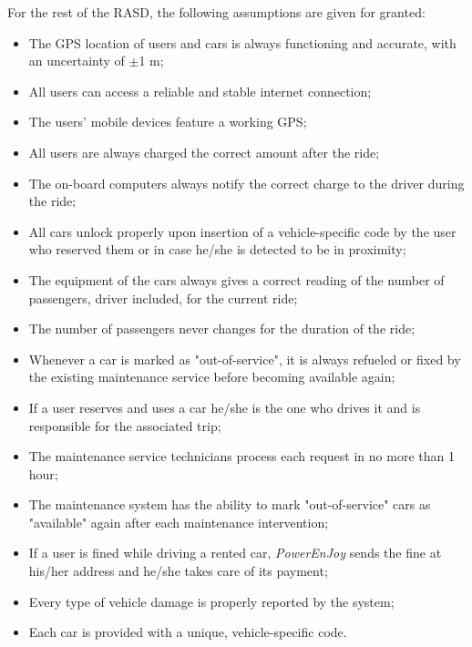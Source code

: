 For the rest of the RASD, the following assumptions are given for granted:

\begin{itemize}
\item The GPS location of users and cars is always functioning and accurate, with an uncertainty of $\pm$1 m; 
\item All users can access a reliable and stable internet connection;
\item The users' mobile devices feature a working GPS;
\item All users are always charged the correct amount after the ride;
\item The on-board computers always notify the correct charge to the driver during the ride;
\item All cars unlock properly upon insertion of a vehicle-specific code by the user who reserved them or in case he/she is detected to be in proximity;
\item The equipment of the cars always gives a correct reading of the number of passengers, driver included, for the current ride;
\item The number of passengers never changes for the duration of the ride;
\item Whenever a car is marked as "out-of-service", it is always refueled or fixed by the existing maintenance service before becoming available again;
\item If a user reserves and uses a car he/she is the one who drives it and is responsible for the associated trip;
\item The maintenance service technicians process each request in no more than 1 hour;
\item The maintenance system has the ability to mark "out-of-service" cars as "available" again after each maintenance intervention;
\item If a user is fined while driving a rented car, \emph{PowerEnJoy} sends the fine at his/her address and he/she takes care of its payment;
\item Every type of vehicle damage is properly reported by the system;
\item Each car is provided with a unique, vehicle-specific code.
\end{itemize}